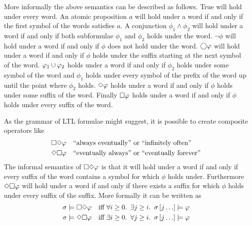 More informally the above semantics can be described as follows. True will hold under every word. An atomic proposition $a$ will hold under a word if and only if the first symbol of the words satisfies $a$. A conjunction $\phi_1 \land \phi_2$ will hold under a word if and only if both subformulae $\phi_1$ and $\phi_2$ holds under the word. $\lnot \phi$ will hold under a word if and only if $\phi$ does not hold under the word. $\bigcirc\varphi$ will hold under a word if and only if $\phi$ holds under the suffix starting at the next symbol of the word. $\varphi_1 \cup \varphi_2$ holds under a word if and only if $\phi_2$ holds under some symbol of the word and $\phi_1$ holds under every symbol of the prefix of the word up until the point where $\phi_2$ holds. $\Diamond \varphi$ holds under a word if and only if $\phi$ holds under some suffix of the word. Finally $\square \varphi$ holds under a word if and only if $\phi$ holds under every suffix of the word.

As the grammar of LTL formulae might suggest, it is possible to create composite operators like
\begin{align*}
    &\square\Diamond\varphi \quad \text{``always eventually'' or ``infinitely often''}\\
    &\Diamond\square\varphi \quad \text{``eventually always'' or ``eventually forever''}
\end{align*}
The informal semantics of $\square\Diamond\varphi$ is that it will hold under a word if and only if every suffix of the word contains a symbol for which $\phi$ holds under. Furthermore $\Diamond\square\varphi$ will hold under a word if and only if there exists a suffix for which $\phi$ holds under every suffix of the suffix. More formally it can be written as~\cite{baier2008principles}
\begin{align*}
    \sigma &\models \square\Diamond \varphi &\text{iff }& \forall i \geq 0.\enskip \exists j \geq i.\enskip \sigma\left[j\ldots\right] \models \varphi \\
    \sigma &\models \Diamond\square \varphi &\text{iff }& \exists i \geq 0.\enskip \forall j \geq i.\enskip \sigma\left[j\ldots\right] \models \varphi
\end{align*}

